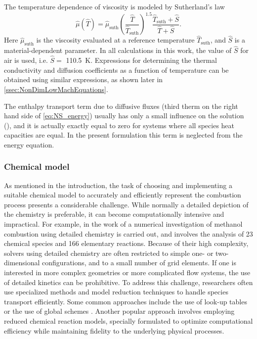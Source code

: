 The temperature dependence of viscosity is modeled by Sutherland's law \parencite{sutherlandLIIViscosityGases1893}
\begin{equation}\label{eq:DimSutherland}
	\hat{\mu}(\hat{T}) = \hat{\mu}_{\text{suth}}\left(\frac{\hat{T}}{\hat{T}_{\text{suth}}}\right)^{1.5}\frac{\hat{T}_{\text{suth}} + \hat{S}}{\hat{T}+\hat{S}}.
\end{equation}
Here $\hat{\mu}_{\text{suth}}$ is the viscosity evaluated at a reference temperature $\hat{T}_{\text{suth}}$, and $\hat S$ is a material-dependent parameter. In all calculations in this work, the value of $\hat{S}$ for air is used, i.e. $\hat{S} = $ \SI{110.5}{\kelvin}. Expressions for determining the thermal conductivity and diffusion coefficients as a function of temperature can be obtained using similar expressions, as shown later in \cref{ssec:NonDimLowMachEquations}.

The enthalpy transport term due to diffusive fluxes (third therm on the right hand side of \cref{eq:NS_energy}) usually has only a small influence on the solution (\textcite{smokeFormulationPremixedNonpremixed1991, goeyModelingSmallScale1995,paxionDevelopmentParallelUnstructured2001}), and it is actually exactly equal to zero for systems where all species heat capacities are equal. In the present formulation this term is neglected from the energy equation. 


\subsubsection{Chemical model}
As mentioned in the introduction, the task of choosing and implementing a suitable chemical model to accurately and efficiently represent the combustion process presents a considerable challenge. While normally a detailed depiction of the chemistry is preferable, it can become computationally intensive and impractical. For example, in the work of \textcite{stauchDetailedNumericalSimulation2006} a numerical investigation of methanol combustion using detailed chemistry is carried out, and involves the analysis of 23 chemical species and 166 elementary reactions. Because of their high complexity, solvers using detailed chemistry are often restricted to simple one- or two-dimensional configurations, and to a small number of grid elements. If one is interested in more complex geometries or more complicated flow systems, the use of detailed kinetics can be prohibitive.  To address this challenge, researchers often use specialized methods and model reduction techniques to handle species transport efficiently. Some common approaches include the use of look-up tables or the use of global schemes \parencite{poinsotTheoreticalNumericalCombustion2011}. Another popular approach involves employing reduced chemical reaction models, specially formulated to optimize computational efficiency while maintaining fidelity to the underlying physical processes.

